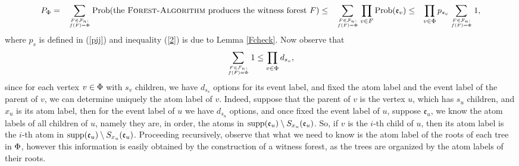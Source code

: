 \documentclass[11pt]{article}
\let\\=\noindent
\let\\=\noindent
\def\obj{{\rm supp}}
\def\prob{{\rm Prob}}
\def\ev{{\mathfrak{e}}}
\begin{document}


\begin{eqnarray}
  P_\F &=& \sum_{F\in {\mathcal{ F}}_n ; \atop f(F)=\F}\prob(\mbox{the \textsc{Forest-Algorithm} produces the witness forest} \ F) \label{1}\\
       &\le& \sum_{F\in {\mathcal{F}}_n ;\atop f(F)=\F}\prod_{v\in F}\prob(\ev_v) \label{2}\\
       &\leq& \prod_{v\in \F}p_{s_v}\sum_{F\in {\mathcal{F}_n};\atop f(F)=\F}1, \label{3}
\end{eqnarray}
where $p_s$ is defined in (\ref{pij}) and inequality (\ref{2}) is due to Lemma \ref{Fcheck}. Now observe that
\begin{equation}
\sum_{F\in {\mathcal{ F}_n;}\atop f(F)=\Phi}1\le \prod_{v\in \Phi}d_{s_v},
\end{equation}
since for each vertex $v \in \Phi$ with $s_v$ children, we have $d_{s_v}$ options for its event label, and fixed the atom label and the event label of the parent of $v$, we can determine uniquely the atom label of $v$. Indeed, suppose that the parent of $v$ is the vertex $u$, which has $s_u$ children, and $x_u$ is its atom label, then for the event label of $u$ we have $d_{s_u}$ options, and once fixed the event label of $u$, suppose $\ev_u$, we know the atom labels of all children of $u$, namely they are, in order, the atoms in $\obj(\ev_u) \setminus S_{x_u}(\ev_u)$. So, if $v$ is the $i$-th child of $u$, then its atom label is the $i$-th atom in $\obj(\ev_u) \setminus S_{x_u}(\ev_u)$. Proceeding recursively, observe that what we need to know is the atom label of the roots of each tree in $\Phi$, however this information is easily obtained by the construction of a witness forest, as the trees are organized by the atom labels of their roots.
\end{document}
